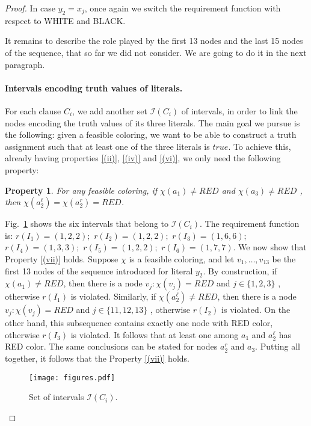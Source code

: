 \documentclass[a4paper,11pt]{article}
\theoremstyle{theorem}
\newtheorem{property}[theorem]{Property}
\begin{document}
\begin{proof}
In case $y_2 = x_j$, once again we switch the requirement function with respect to WHITE and BLACK. 

\smallskip
\noindent It remains to describe the role played by the first 13 nodes and the last 15 nodes of the sequence, that so far we did not consider. We are going to do it in the next paragraph.

\paragraph{Intervals encoding truth values of literals.} For each clause $C_i$, we add another set $\mathcal I(C_i)$ of intervals, in order to link the nodes encoding the truth values of its three literals. The main goal we pursue is the following: given a feasible coloring, we want to be able to construct a truth assignment such that at least one of the three literals is $true$. To achieve this, already having properties \eqref{(ii)}, \eqref{(iv)} and \eqref{(vi)}, we only need the following property:

\begin{property}\label{(vii)}
For any feasible coloring, if $\chi(a_1) \neq RED$ and $\chi(a_3) \neq RED$ , then $\chi(a_2^{\ell}) = \chi(a_2^r) = RED$.
\end{property}

\noindent Fig.~\ref{fig:5} shows the six intervals that belong to $\mathcal I(C_i)$. The requirement function is: $r(I_1)=(1,2,2);$ $r(I_2)=(1,2,2);$ $r(I_3)=(1,6,6);$ $r(I_4)=(1,3,3);$ $r(I_5)=(1,2,2);$ $r(I_6)=(1,7,7)$. We now show that Property \eqref{(vii)} holds.
Suppose $\chi$ is a feasible coloring, and let $v_1, \dots, v_{13}$ be the first 13 nodes of the sequence introduced for literal $y_2$. By construction, if $\chi(a_1) \neq RED$, then there is a node $v_j : \chi(v_j) = RED$ and $j \in \{1,2,3\}$ , otherwise $r(I_1)$ is violated. Similarly, if $\chi(a_2^{\ell}) \neq RED$, then there is a node $v_j : \chi(v_j) = RED$ and $j \in \{11,12,13\}$ , otherwise $r(I_2)$ is violated. On the other hand, this subsequence contains exactly one node with RED color, otherwise $r(I_3)$ is violated. It follows that at least one among $a_1$ and $a_2^{\ell}$ has RED color. The same conclusions can be stated for nodes $a_2^r$ and $a_3$. Putting all together, it follows that the Property \eqref{(vii)} holds. 

\begin{figure}[htb]
\centering
\texttt{[image: figures.pdf]} 
\caption{Set of intervals $\mathcal I(C_i)$.}
\label{fig:5}
\end{figure}



\end{proof}
\end{document}
